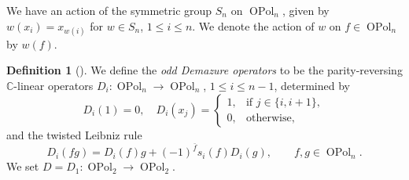 \documentclass[11pt]{amsart}
\theoremstyle{definition}
\newtheorem{defn}[theo]{Definition}
\numberwithin{equation}{section}
\begin{document}
We have an action of the symmetric group $ S_{n} $ on $ \operatorname{OPol}_{n} $, given by $ w(x_{i}) = x_{w(i)} $ for $ w \in S_{n} $, $ 1 \leq i \leq n $. We denote the action of \(w\) on $ f \in \operatorname{OPol}_{n} $ by $ w(f) $. 

\begin{defn}[{\cite[§2.2.1]{Ellis-Khovanov-Lauda}}] \label{oddDemazure}
We define the \emph{odd Demazure operators} to be the parity-reversing $ \mathbb{C} $-linear operators $ D_{i} \colon \operatorname{OPol}_{n} \rightarrow \operatorname{OPol}_{n} $, $ 1 \leq i \leq n-1 $, determined by
\begin{equation}
D_{i}(1) = 0, \quad
D_{i}(x_{j}) =
\begin{cases}
1, & \text{if } j \in \{i,i+1\},\\
0, & \text{otherwise},
\end{cases}
\label{oddDemazure_6757}
\end{equation}
and the twisted Leibniz rule
\begin{equation} \label{oddLeibnizrule}
D_{i}(fg) = D_{i}(f)g + (-1)^{\bar{f}} s_{i}(f)D_{i}(g), \qquad f,g \in \operatorname{OPol}_{n}.
\end{equation}
We set $ D = D_{1} \colon \operatorname{OPol}_{2} \rightarrow \operatorname{OPol}_{2} $.
\end{defn}
\end{document}
